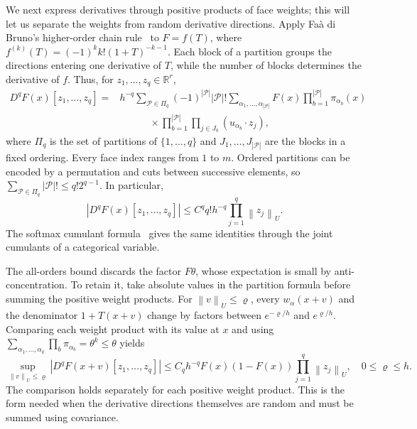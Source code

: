 \documentclass[11pt,letterpaper]{article}
\theoremstyle{remark}
\newcommand{\R}{\mathbb R}
\newcommand{\norm}[1]{\left\lVert#1\right\rVert}
\begin{document}
We next express derivatives through positive products of face weights;
this will let us separate the weights from random derivative directions.
Apply Fa\`a di Bruno's higher-order chain rule~\cite{Comtet1974}
to \(F=f(T)\), where
\(f^{(k)}(T)=(-1)^k k!(1+T)^{-k-1}\). Each block of a partition
groups the directions entering one derivative of \(T\), while the
number of blocks determines the derivative of \(f\). Thus, for
\(z_1,\ldots,z_q\in\R^r\),
\begin{equation}
 \begin{split}
 D^qF(x)[z_1,\ldots,z_q]
 ={}&h^{-q}\sum_{\mathcal P\in\Pi_q}(-1)^{|\mathcal P|}|\mathcal P|!
 \sum_{\alpha_1,\ldots,\alpha_{|\mathcal P|}}
 F(x)\prod_{b=1}^{|\mathcal P|}\pi_{\alpha_b}(x)\\
 &\hspace{3em}\times
 \prod_{b=1}^{|\mathcal P|}\prod_{j\in J_b}
 (u_{\alpha_b}\cdot z_j),
 \end{split}
 \label{appx-eq:partition-derivative}
\end{equation}
where \(\Pi_q\) is the set of partitions of \(\{1,\ldots,q\}\)
and \(J_1,\ldots,J_{|\mathcal P|}\) are the blocks in a fixed
ordering. Every face index ranges from \(1\) to \(m\).
Ordered partitions can be encoded by a permutation and cuts between
successive elements, so
\(\sum_{\mathcal P\in\Pi_q}|\mathcal P|!\le q!2^{q-1}\).
In particular,
\begin{equation}
 |D^qF(x)[z_1,\ldots,z_q]|
 \le C^q q!h^{-q}\prod_{j=1}^q\norm{z_j}_U.
 \label{appx-eq:all-orders}
\end{equation}
The softmax cumulant formula~\cite[Lemma~13]{GaoZhang} gives the
same identities through the joint cumulants of a categorical variable.

The all-orders bound discards the factor \(F\theta\), whose expectation
is small by anti-concentration. To retain it, take absolute values
in the partition formula before summing the positive weight products.
For \(\norm v_U\le\varrho\), every \(w_\alpha(x+v)\) and the
denominator \(1+T(x+v)\) change by factors between
\(e^{-\varrho/h}\) and \(e^{\varrho/h}\). Comparing each weight
product with its value at \(x\) and using
\(\sum_{\alpha_1,\ldots,\alpha_k}\prod_b\pi_{\alpha_b}
=\theta^k\le\theta\) yields
\begin{equation}
 \sup_{\norm v_U\le\varrho}|D^qF(x+v)[z_1,\ldots,z_q]|
 \le C_qh^{-q}F(x)(1-F(x))\prod_{j=1}^q\norm{z_j}_U,
 \quad 0\le\varrho\le h.
 \label{appx-eq:local-envelope}
\end{equation}
The comparison holds separately for each positive weight product.
This is the form needed when the derivative directions themselves
are random and must be summed using covariance.
\end{document}
